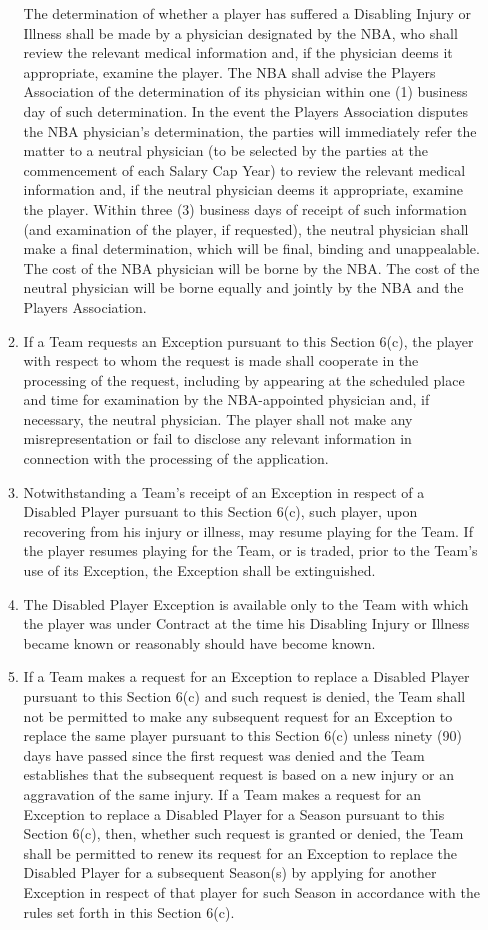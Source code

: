 \documentclass[
]{book}
\begin{document}
\begin{enumerate}
\begin{enumerate}
    The determination of whether a player has suffered a Disabling Injury or Illness shall be made by a physician designated by the NBA, who shall review the relevant medical information and, if the physician deems it appropriate, examine the player. The NBA shall advise the Players Association of the determination of its physician within one (1) business day of such determination. In the event the Players Association disputes the NBA physician's determination, the parties will immediately refer the matter to a neutral physician (to be selected by the parties at the commencement of each Salary Cap Year) to review the relevant medical information and, if the neutral physician deems it appropriate, examine the player. Within three (3) business days of receipt of such information (and examination of the player, if requested), the neutral physician shall make a final determination, which will be final, binding and unappealable. The cost of the NBA physician will be borne by the NBA. The cost of the neutral physician will be borne equally and jointly by the NBA and the Players Association.
  \item
    If a Team requests an Exception pursuant to this Section 6(c), the player with respect to whom the request is made shall cooperate in the processing of the request, including by appearing at the scheduled place and time for examination by the NBA-appointed physician and, if necessary, the neutral physician. The player shall not make any misrepresentation or fail to disclose any relevant information in connection with the processing of the application.
  \item
    Notwithstanding a Team's receipt of an Exception in respect of a Disabled Player pursuant to this Section 6(c), such player, upon recovering from his injury or illness, may resume playing for the Team. If the player resumes playing for the Team, or is traded, prior to the Team's use of its Exception, the Exception shall be extinguished.
  \item
    The Disabled Player Exception is available only to the Team with which the player was under Contract at the time his Disabling Injury or Illness became known or reasonably should have become known.
  \item
    If a Team makes a request for an Exception to replace a Disabled Player pursuant to this Section 6(c) and such request is denied, the Team shall not be permitted to make any subsequent request for an Exception to replace the same player pursuant to this Section 6(c) unless ninety (90) days have passed since the first request was denied and the Team establishes that the subsequent request is based on a new injury or an aggravation of the same injury. If a Team makes a request for an Exception to replace a Disabled Player for a Season pursuant to this Section 6(c), then, whether such request is granted or denied, the Team shall be permitted to renew its request for an Exception to replace the Disabled Player for a subsequent Season(s) by applying for another Exception in respect of that player for such Season in accordance with the rules set forth in this Section 6(c).

\end{enumerate}
\end{enumerate}
\end{document}
